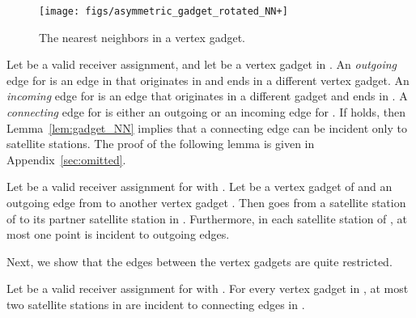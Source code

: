 \documentclass[envcountsect,envcountsame,runningheads,a4paper]{llncs}
\begin{document}
\begin{figure}[htbp]
  \centering
  \texttt{[image: figs/asymmetric\_gadget\_rotated\_NN+]}
  \caption{The nearest
    neighbors in a vertex gadget. }
  \label{fig:gadget_NN+}
\end{figure}

Let  be a valid receiver assignment,  and
let  be a vertex gadget in . An \emph{outgoing}
edge for  is an edge in  that originates
in  and ends in a different vertex gadget.
An \emph{incoming} edge for  is an edge that
originates in a different gadget and ends in .
A \emph{connecting} edge for  is either an outgoing
or an incoming edge for . If  holds, then
Lemma~\ref{lem:gadget_NN} implies that a connecting
edge can be incident only to satellite
stations. The proof of the following lemma is given in Appendix~\ref{sec:omitted}.

\begin{lemma}\label{lem:outedge}
Let  be a valid receiver assignment for 
with .
Let  be a vertex gadget of  and
 an outgoing edge from 
to another vertex gadget .
Then  goes from a satellite station of  to
its partner satellite station in .
Furthermore, in each satellite station of ,
at most one point is incident to outgoing edges.
\end{lemma}

\noindent
Next, we show that the edges between the vertex gadgets are
quite restricted.

\begin{lemma}
\label{lem:inout}
Let  be a valid receiver assignment for
 with .
For every vertex gadget  in ,
at most two satellite stations in 
are incident to connecting edges in .
\end{lemma}
\end{document}
